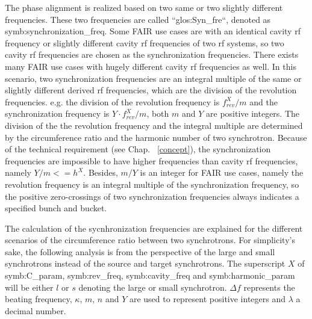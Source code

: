 The phase alignment is realized based on two same or two slightly different frequencies. These two frequencies are called ``\gls{glos:Syn_fre}``, denoted as \gls{symb:synchronization_freq}. Some FAIR use cases are with an identical cavity rf frequency or slightly different cavity rf frequencies of two rf systems, so two cavity rf frequencies are chosen as the synchronization frequencies. There exists many FAIR use cases with hugely different cavity rf frequencies as well. In this scenario, two synchronization frequencies are an integral multiple of the same or slightly different derived rf frequencies, which are the division of the revolution frequencies. e.g. the division of the revolution frequency is $f_\mathit{rev}^{X}/m$ and the synchronization frequency is $Y\cdot f_\mathit{rev}^{X}/m$, both $m$ and $Y$ are positive integers. The division of the the revolution frequency and the integral multiple are determined by the circumference ratio and the harmonic number of two synchrotron. Because of the technical requirement (see Chap. ~\ref{concept}), the synchronization frequencies are impossible to have higher frequencies than cavity rf frequencies, namely $Y/m <=h^X$. Besides, $m/Y$ is an integer for FAIR use cases, namely the revolution frequency is an integral multiple of the synchronization frequency, so the positive zero-crossings of two synchronization frequencies always indicates a specified bunch and bucket.

The calculation of the sycnhronization frequencies are explained for the different scenarios of the circumference ratio between two synchrotrons. For simplicity's sake, the following analysis is from the perspective of the large and small synchrotrons instead of the source and target synchrotrons. The superscript $X$ of \gls{symb:C_param}, \gls{symb:rev_freq}, \gls{symb:cavity_freq} and \gls{symb:harmonic_param} will be either $l$ or $s$ denoting the large or small synchrotron. $\Delta f$ represents the beating frequency, $\kappa$, $m$, $n$ and $Y$ are used to represent positive integers and $\lambda$ a decimal number.

%
 


